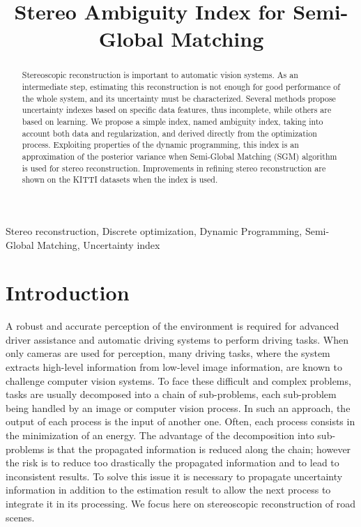 \documentclass{article}
\title{Stereo Ambiguity Index for Semi-Global Matching}
\begin{document}
\ninept
%
\maketitle
%

\begin{abstract}
Stereoscopic reconstruction is important to automatic vision systems. As an intermediate step, estimating this reconstruction is not enough for good performance of the whole system, and its uncertainty must be characterized. Several methods propose uncertainty indexes based on specific data features, thus incomplete, while others are based on learning. We propose a simple index, named ambiguity index, taking into account both data and regularization, and derived directly from the optimization process. Exploiting properties of the dynamic programming, this index is an approximation of the posterior variance when Semi-Global Matching (SGM) algorithm is used for stereo reconstruction. Improvements in refining stereo reconstruction are shown on the KITTI datasets when the index is used.
\end{abstract}
\begin{keywords}
Stereo reconstruction, Discrete optimization, Dynamic Programming, Semi-Global Matching, Uncertainty index
\end{keywords}

\section{Introduction}
\label{sec:intro}

A robust and accurate perception of the environment is required for advanced driver assistance and automatic driving systems to perform driving tasks. When only cameras are used for perception, many driving tasks, where the system extracts high-level information from low-level image information, are known to challenge computer vision systems. To face these difficult and complex problems, tasks are usually decomposed into a chain of sub-problems, each sub-problem being handled by an image or computer vision process. In such an approach, the output of each process is the input of another one. Often, each process consists in the minimization of an energy. The advantage of the decomposition into sub-problems is that the propagated information is reduced along the chain; however the risk is to reduce too drastically the propagated information and to lead to inconsistent results. To solve this issue it is necessary to propagate uncertainty information in addition to the estimation result to allow the next process to integrate it in its processing. We focus here on stereoscopic reconstruction of road scenes.
\end{document}
